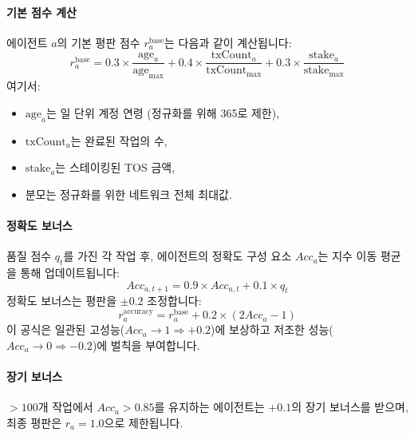 \documentclass[11pt]{article}
\begin{document}
\paragraph{기본 점수 계산} 에이전트 $a$의 기본 평판 점수 $r_a^{\text{base}}$는 다음과 같이 계산됩니다:
\begin{equation}
r_a^{\text{base}} = 0.3 \times \frac{\text{age}_a}{\text{age}_{\max}} + 0.4 \times \frac{\text{txCount}_a}{\text{txCount}_{\max}} + 0.3 \times \frac{\text{stake}_a}{\text{stake}_{\max}}
\end{equation}
여기서:
\begin{itemize}[noitemsep]
  \item $\text{age}_a$는 일 단위 계정 연령 (정규화를 위해 365로 제한),
  \item $\text{txCount}_a$는 완료된 작업의 수,
  \item $\text{stake}_a$는 스테이킹된 TOS 금액,
  \item 분모는 정규화를 위한 네트워크 전체 최대값.
\end{itemize}

\paragraph{정확도 보너스} 품질 점수 $q_t$를 가진 각 작업 후, 에이전트의 정확도 구성 요소 $Acc_a$는 지수 이동 평균을 통해 업데이트됩니다:
\begin{equation}
Acc_{a,t+1} = 0.9 \times Acc_{a,t} + 0.1 \times q_t
\end{equation}
정확도 보너스는 평판을 $\pm 0.2$ 조정합니다:
\begin{equation}
r_a^{\text{accuracy}} = r_a^{\text{base}} + 0.2 \times (2 Acc_a - 1)
\end{equation}
이 공식은 일관된 고성능($Acc_a \to 1 \Rightarrow +0.2$)에 보상하고 저조한 성능($Acc_a \to 0 \Rightarrow -0.2$)에 벌칙을 부여합니다.

\paragraph{장기 보너스} $>100$개 작업에서 $Acc_a > 0.85$를 유지하는 에이전트는 $+0.1$의 장기 보너스를 받으며, 최종 평판은 $r_a = 1.0$으로 제한됩니다.
\end{document}
